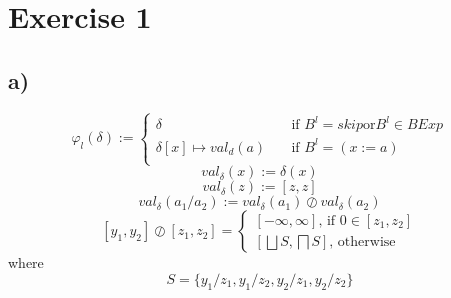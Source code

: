 \documentclass[fleqn,12pt]{article}
\begin{document}
\section*{Exercise 1}
\subsection*{a)}
\[ \varphi_l(\delta) :=
  \begin{cases}
    \delta       & \quad \text{if } B^l = skip \text{or} B^l \in BExp\\
    \delta [x] \mapsto val_d(a) & \quad \text{if } B^l=(x:=a)\\
  \end{cases}
\]
$$val_{\delta}(x):=\delta (x)$$
$$val_{\delta}(z):=[z,z]$$
$$val_{\delta}(a_1/a_2):=val_{\delta}(a_1) \oslash val_{\delta}(a_2)$$
$$[y_1,y_2] \oslash [z_1,z_2]=
	\begin{cases}
		[-\infty,\infty]\text{, if } 0 \in [z_1,z_2]\\
		[\bigsqcup S,\bigsqcap S] \text{, otherwise}
	\end{cases}$$
where $$S=\{y_1/z_1,y_1/z_2,y_2/z_1,y_2/z_2\}$$
\end{document}
